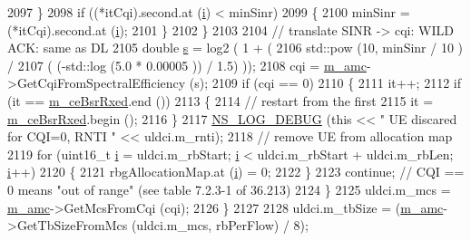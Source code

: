 \begin{DoxyCode}
2097                 \}
2098               \textcolor{keywordflow}{if} ((*itCqi).second.at (\hyperlink{bernuolliDistribution_8m_a6f6ccfcf58b31cb6412107d9d5281426}{i}) < minSinr)
2099                 \{
2100                   minSinr = (*itCqi).second.at (\hyperlink{bernuolliDistribution_8m_a6f6ccfcf58b31cb6412107d9d5281426}{i});
2101                 \}
2102             \}
2103 
2104           \textcolor{comment}{// translate SINR -> cqi: WILD ACK: same as DL}
2105           \textcolor{keywordtype}{double} \hyperlink{generate__test__data__lte__sinr_8m_ad83eeb3a142285d1243a08c6b7026df8}{s} = log2 ( 1 + (
2106                                  std::pow (10, minSinr / 10 )  /
2107                                  ( (-std::log (5.0 * 0.00005 )) / 1.5) ));
2108           cqi = \hyperlink{classns3_1_1PssFfMacScheduler_a0cbf5421430268701ab8a313ab912785}{m\_amc}->GetCqiFromSpectralEfficiency (s);
2109           \textcolor{keywordflow}{if} (cqi == 0)
2110             \{
2111               it++;
2112               \textcolor{keywordflow}{if} (it == \hyperlink{classns3_1_1PssFfMacScheduler_a7adb86186e0190e6b0aa66a562499268}{m\_ceBsrRxed}.end ())
2113                 \{
2114                   \textcolor{comment}{// restart from the first}
2115                   it = \hyperlink{classns3_1_1PssFfMacScheduler_a7adb86186e0190e6b0aa66a562499268}{m\_ceBsrRxed}.begin ();
2116                 \}
2117               \hyperlink{group__logging_ga413f1886406d49f59a6a0a89b77b4d0a}{NS\_LOG\_DEBUG} (\textcolor{keyword}{this} << \textcolor{stringliteral}{" UE discared for CQI=0, RNTI "} << uldci.m\_rnti);
2118               \textcolor{comment}{// remove UE from allocation map}
2119               \textcolor{keywordflow}{for} (uint16\_t \hyperlink{bernuolliDistribution_8m_a6f6ccfcf58b31cb6412107d9d5281426}{i} = uldci.m\_rbStart; \hyperlink{bernuolliDistribution_8m_a6f6ccfcf58b31cb6412107d9d5281426}{i} < uldci.m\_rbStart + uldci.m\_rbLen; 
      \hyperlink{bernuolliDistribution_8m_a6f6ccfcf58b31cb6412107d9d5281426}{i}++)
2120                 \{
2121                   rbgAllocationMap.at (\hyperlink{bernuolliDistribution_8m_a6f6ccfcf58b31cb6412107d9d5281426}{i}) = 0;
2122                 \}
2123               \textcolor{keywordflow}{continue}; \textcolor{comment}{// CQI == 0 means "out of range" (see table 7.2.3-1 of 36.213)}
2124             \}
2125           uldci.m\_mcs = \hyperlink{classns3_1_1PssFfMacScheduler_a0cbf5421430268701ab8a313ab912785}{m\_amc}->GetMcsFromCqi (cqi);
2126         \}
2127 
2128       uldci.m\_tbSize = (\hyperlink{classns3_1_1PssFfMacScheduler_a0cbf5421430268701ab8a313ab912785}{m\_amc}->GetTbSizeFromMcs (uldci.m\_mcs, rbPerFlow) / 8);

\end{DoxyCode}
